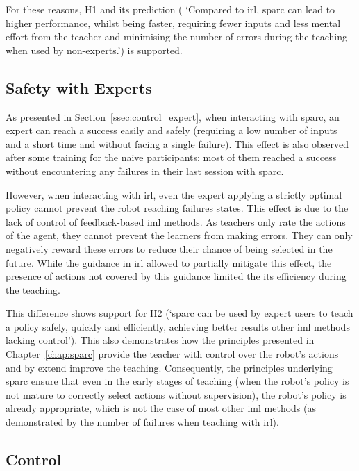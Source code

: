 For these reasons, H1 and its prediction ( `Compared to \gls{irl}, \gls{sparc} can lead to higher performance, whilst being faster, requiring fewer inputs and less mental effort from the teacher and minimising the number of errors during the teaching when used by non-experts.') is supported.

\subsection{Safety with Experts}

As presented in Section~\ref{ssec:control_expert}, when interacting with \gls{sparc}, an expert can reach a success easily and safely (requiring a low number of inputs and a short time and without facing a single failure). This effect is also observed after some training for the naive participants: most of them reached a success without encountering any failures in their last session with \gls{sparc}.

However, when interacting with \gls{irl}, even the expert applying a strictly optimal policy cannot prevent the robot reaching failures states. This effect is due to the lack of control of feedback-based \gls{iml} methods. As teachers only rate the actions of the agent, they cannot prevent the learners from making errors. They can only negatively reward these errors to reduce their chance of being selected in the future. While the guidance in \gls{irl} allowed to partially mitigate this effect, the presence of actions not covered by this guidance limited the its efficiency during the teaching.

This difference shows support for H2 (`\gls{sparc} can be used by expert users to teach a policy safely, quickly and efficiently, achieving better results other \gls{iml} methods lacking control'). This also demonstrates how the principles presented in Chapter~\ref{chap:sparc} provide the teacher with control over the robot's actions and by extend improve the teaching. Consequently, the principles underlying \gls{sparc} ensure that even in the early stages of teaching (when the robot's policy is not mature to correctly select actions without supervision), the robot's policy is already appropriate, which is not the case of most other \gls{iml} methods (as demonstrated by the number of failures when teaching with \gls{irl}).

\subsection{Control}
\label{ssec:control_control}


